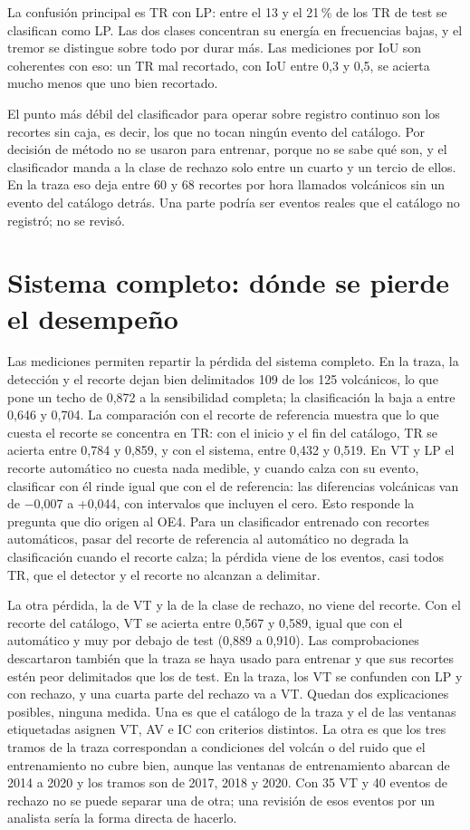 La confusión principal es TR con LP: entre el 13 y el 21\,\% de los TR de test
se clasifican como LP. Las dos clases concentran su energía en frecuencias
bajas, y el tremor se distingue sobre todo por durar más. Las mediciones por
IoU son coherentes con eso: un TR mal recortado, con IoU entre 0,3 y 0,5, se
acierta mucho menos que uno bien recortado.

El punto más débil del clasificador para operar sobre registro continuo son
los recortes sin caja, es decir, los que no tocan ningún evento del catálogo.
Por decisión de método no se usaron para entrenar, porque no se sabe qué son,
y el clasificador manda a la clase de rechazo solo entre un cuarto y un tercio
de ellos. En la traza eso deja entre 60 y 68 recortes por hora llamados
volcánicos sin un evento del catálogo detrás. Una parte podría ser eventos
reales que el catálogo no registró; no se revisó.

\section{Sistema completo: dónde se pierde el desempeño}
\label{sec:disc-sistema}

Las mediciones permiten repartir la pérdida del sistema completo. En la traza,
la detección y el recorte dejan bien delimitados 109 de los 125 volcánicos,
lo que pone un techo de 0,872 a la sensibilidad completa; la clasificación la
baja a entre 0,646 y 0,704. La comparación con el recorte de referencia
muestra que lo que cuesta el recorte se concentra en TR: con el inicio y el
fin del catálogo, TR se acierta entre 0,784 y 0,859, y con el sistema, entre
0,432 y 0,519. En VT y LP el recorte automático no cuesta nada medible, y
cuando calza con su evento, clasificar con él rinde igual que con el de
referencia: las diferencias volcánicas van de $-$0,007 a +0,044, con
intervalos que incluyen el cero. Esto responde la pregunta que dio origen al
OE4. Para un clasificador entrenado con recortes automáticos, pasar del recorte
de referencia al automático no degrada la clasificación cuando el recorte
calza; la pérdida viene de los eventos, casi todos TR, que el detector y el
recorte no alcanzan a delimitar.

La otra pérdida, la de VT y la de la clase de rechazo, no viene del recorte.
Con el recorte del catálogo, VT se acierta entre 0,567 y 0,589, igual que con
el automático y muy por debajo de test (0,889 a 0,910). Las comprobaciones
descartaron también que la traza se haya usado para entrenar y que sus
recortes estén peor delimitados que los de test. En la traza, los VT se
confunden con LP y con rechazo, y una cuarta parte del rechazo va a VT. Quedan
dos explicaciones posibles, ninguna medida. Una es que el catálogo de la traza
y el de las ventanas etiquetadas asignen VT, AV e IC con criterios distintos.
La otra es que los tres tramos de la traza correspondan a condiciones del
volcán o del ruido que el entrenamiento no cubre bien, aunque las ventanas de
entrenamiento abarcan de 2014 a 2020 y los tramos son de 2017, 2018 y 2020.
Con 35 VT y 40 eventos de rechazo no se puede separar una de otra; una
revisión de esos eventos por un analista sería la forma directa de hacerlo.

